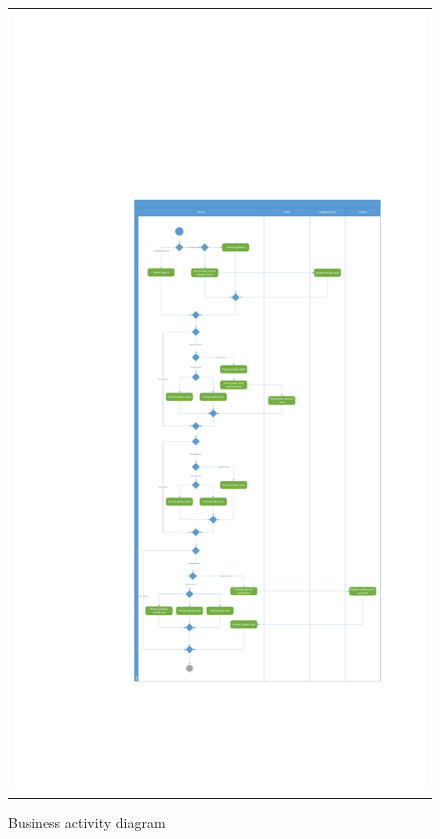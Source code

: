 \documentclass{sprawozdanie-agh}
\begin{document}
			\begin{figure}[H]
				\centering
				\begin{tabular}{c}
					\includegraphics[height=\textheight]{Business_Activity_Diagram} 
				\end{tabular}
				\caption{Business activity diagram}
			\end{figure}
\end{document}
